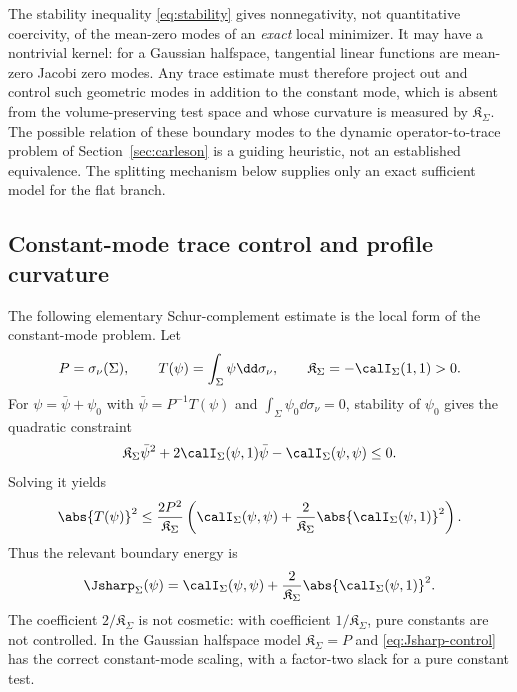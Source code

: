 \documentclass[../../main.tex]{subfiles}
\begin{document}
\begin{remark}
\label{rem:constant-mode}
The stability inequality \eqref{eq:stability} gives nonnegativity, not quantitative coercivity,
of the mean-zero modes of an \emph{exact} local minimizer. It may have a nontrivial kernel: for
a Gaussian halfspace, tangential linear functions are mean-zero Jacobi zero modes. Any trace
estimate must therefore project out and control such geometric modes in addition to the constant
mode, which is absent from the volume-preserving test space and whose curvature is measured by
$\mathfrak K_\Sigma$. The possible relation of these boundary modes to the dynamic
operator-to-trace problem of Section~\ref{sec:carleson} is a guiding heuristic, not an
established equivalence. The splitting mechanism below supplies only an exact sufficient model
for the flat branch.
\end{remark}

\subsection{Constant-mode trace control and profile curvature}

The following elementary Schur-complement estimate is the local form of the constant-mode problem.
Let
\[
  P=\sigma_\nu(\Sigma),\qquad
  T(\psi)=\int_\Sigma\psi\dd\sigma_\nu,\qquad
  \mathfrak K_\Sigma=-\calI_\Sigma(1,1)>0 .
\]
For $\psi=\bar\psi+\psi_0$ with $\bar\psi=P^{-1}T(\psi)$ and
$\int_\Sigma\psi_0\dd\sigma_\nu=0$, stability of $\psi_0$ gives the quadratic constraint
\[
  \mathfrak K_\Sigma\bar\psi^2
  +2\calI_\Sigma(\psi,1)\bar\psi-\calI_\Sigma(\psi,\psi)\le0 .
\]
Solving it yields
\begin{equation}\label{eq:Jsharp-control}
  \abs{T(\psi)}^2
  \le
  \frac{2P^2}{\mathfrak K_\Sigma}
  \left(
    \calI_\Sigma(\psi,\psi)
    +\frac{2}{\mathfrak K_\Sigma}\abs{\calI_\Sigma(\psi,1)}^2
  \right).
\end{equation}
Thus the relevant boundary energy is
\begin{equation}\label{eq:Jsharp-def}
  \Jsharp_\Sigma(\psi)
  =
  \calI_\Sigma(\psi,\psi)
  +\frac{2}{\mathfrak K_\Sigma}\abs{\calI_\Sigma(\psi,1)}^2 .
\end{equation}
The coefficient $2/\mathfrak K_\Sigma$ is not cosmetic: with coefficient
$1/\mathfrak K_\Sigma$, pure constants are not controlled. In the Gaussian halfspace model
$\mathfrak K_\Sigma=P$ and \eqref{eq:Jsharp-control} has the correct constant-mode scaling,
with a factor-two slack for a pure constant test.
\end{document}

